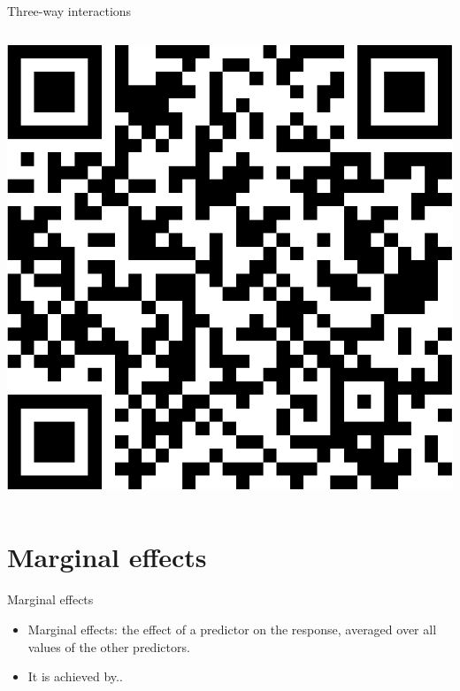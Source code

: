 \documentclass[australian,ignorenonframetext,aspectratio=169]{beamer}
\providecommand{\tightlist}{%
  \setlength{\itemsep}{0pt}\setlength{\parskip}{0pt}}
\begin{document}
\begin{frame}[fragile]{Three-way interactions}
\begin{columns}[T]
\begin{column}{0.5\textwidth}
\begin{center}\includegraphics{../graphs/unnamed-chunk-26-1} \end{center}
\end{column}
\end{columns}

\section{Marginal effects}

\end{frame}

\begin{frame}{Marginal effects}
\protect\hypertarget{marginal-effects}{}

\begin{itemize}
\tightlist
\item
  Marginal effects: the effect of a predictor on the response, averaged
  over all values of the other predictors.
\item
  It is achieved by..
\end{itemize}

\end{frame}
\end{document}
